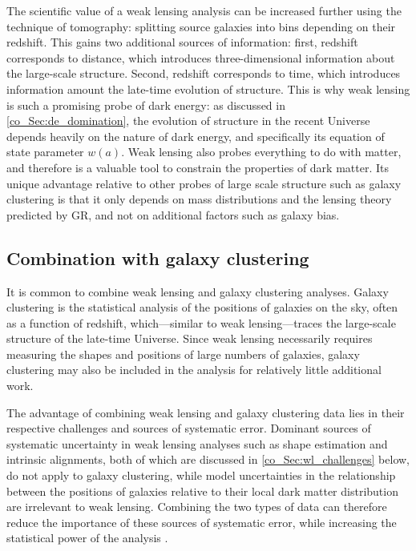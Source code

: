 The scientific value of a weak lensing analysis can be increased further using the technique of tomography: splitting source galaxies into bins depending on their redshift. This gains two additional sources of information: first, redshift corresponds to distance, which introduces three-dimensional information about the large-scale structure. Second, redshift corresponds to time, which introduces information amount the late-time evolution of structure. This is why weak lensing is such a promising probe of dark energy: as discussed in \autoref{co_Sec:de_domination}, the evolution of structure in the recent Universe depends heavily on the nature of dark energy, and specifically its equation of state parameter $w \left( a \right)$. Weak lensing also probes everything to do with matter, and therefore is a valuable tool to constrain the properties of dark matter. Its unique advantage relative to other probes of large scale structure such as galaxy clustering is that it only depends on mass distributions and the lensing theory predicted by GR, and not on additional factors such as galaxy bias.

\subsection{Combination with galaxy clustering}

It is common to combine weak lensing and galaxy clustering analyses. Galaxy clustering is the statistical analysis of the positions of galaxies on the sky, often as a function of redshift, which---similar to weak lensing---traces the large-scale structure of the late-time Universe.
Since weak lensing necessarily requires measuring the shapes and positions of large numbers of galaxies, galaxy clustering may also be included in the analysis for relatively little additional work.

The advantage of combining weak lensing and galaxy clustering data lies in their respective challenges and sources of systematic error. Dominant sources of systematic uncertainty in weak lensing analyses such as shape estimation and intrinsic alignments, both of which are discussed in \autoref{co_Sec:wl_challenges} below, do not apply to galaxy clustering, while model uncertainties in the relationship between the positions of galaxies relative to their local dark matter distribution are irrelevant to weak lensing. Combining the two types of data can therefore reduce the importance of these sources of systematic error, while increasing the statistical power of the analysis \citep[e.g.][]{Abbott2018}.

